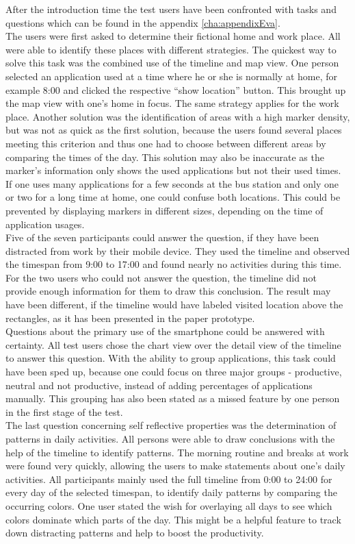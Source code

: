 After the introduction time the test users have been confronted with tasks and questions which can be found in the appendix \ref{cha:appendixEva}.\\
The  users were first asked to determine their fictional home and work place. All were able to identify these places with different strategies. The quickest way to solve this task was the combined use of the timeline and map view. One person selected an application used at a time where he or she is normally at home, for example 8:00 and clicked the respective ``show location'' button. This brought up the map view with one's home in focus. The same strategy applies for the work place. Another solution was the identification of areas with a high marker density, but was not as quick as the first solution, because the users found several places meeting this criterion and thus one had to choose between different areas by comparing the times of the day. This solution may also be inaccurate as the marker's information only shows the used applications but not their used times. If one uses many applications for a few seconds at the bus station and only one or two for a long time at home, one could confuse both locations. This could be prevented by displaying markers in different sizes, depending on the time of application usages.\\
Five  of the seven participants could answer the question, if they have been distracted from work by their mobile device. They used the timeline and observed the timespan from 9:00 to 17:00 and found nearly no activities during this time. For the two users who could not answer the question, the timeline did not provide enough information for them to draw this conclusion. The result may have been different, if the timeline would have labeled visited location above the rectangles, as it has been presented in the paper prototype.\\
Questions  about the primary use of the smartphone could be answered with certainty. All test users chose the chart view over the detail view of the timeline to answer this question. With the ability to group applications, this task could have been sped up, because one could focus on three major groups - productive, neutral and not productive, instead of adding percentages of applications manually. This grouping has also been stated as a missed feature by one person in the first stage of the test.\\
The last question concerning self reflective properties was the determination of patterns in daily activities. All persons were able to draw conclusions with the help of the timeline to identify patterns. The morning routine and breaks at work were found very quickly, allowing the users to make statements about one's daily activities. All participants mainly used the full timeline from 0:00 to 24:00 for every day of the selected timespan, to identify daily patterns by comparing the occurring colors. One user stated the wish for overlaying all days to see which colors dominate which parts of the day. This might be a helpful feature to track down distracting patterns and help to boost the productivity.

